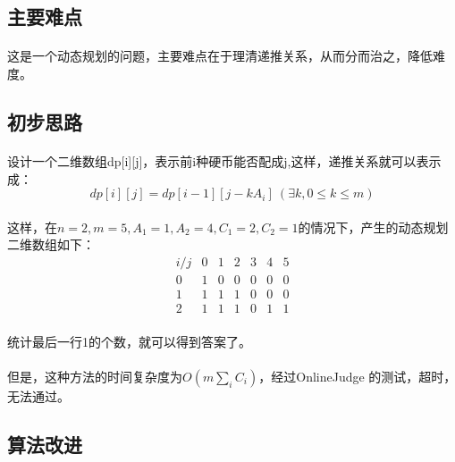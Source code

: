 \documentclass[UTF-8, 12pt]{ctexart}
\begin{document}
    \subsection{主要难点}
    \paragraph{}
    这是一个动态规划的问题，主要难点在于理清递推关系，从而分而治之，降低难度。

    \subsection{初步思路}
    \paragraph{}
    设计一个二维数组dp[i][j]，表示前i种硬币能否配成j,这样，递推关系就可以表示成：
    \[ dp[i][j] = dp[i-1][j-kA_i] \ (\exists k, 0\le k \le m) \]

    \paragraph{}
    这样，在$n = 2, m = 5, A_1 = 1, A_2 = 4, C_1 = 2, C_2 = 1$的情况下，产生的动态规划二维数组如下：
    \begin{equation}
        \begin{array}{ccccccc}
            i/j & 0 & 1 & 2 & 3 & 4 & 5 \\
            0   & 1 & 0 & 0 & 0 & 0 & 0 \\
            1   & 1 & 1 & 1 & 0 & 0 & 0 \\
            2   & 1 & 1 & 1 & 0 & 1 & 1 
        \end{array}
    \end{equation}

    \paragraph{}
    统计最后一行1的个数，就可以得到答案了。
    \paragraph{}
    但是，这种方法的时间复杂度为$O(m\sum_iC_i)$，经过OnlineJudge 的测试，超时，无法通过。

    \subsection{算法改进}
\end{document}

